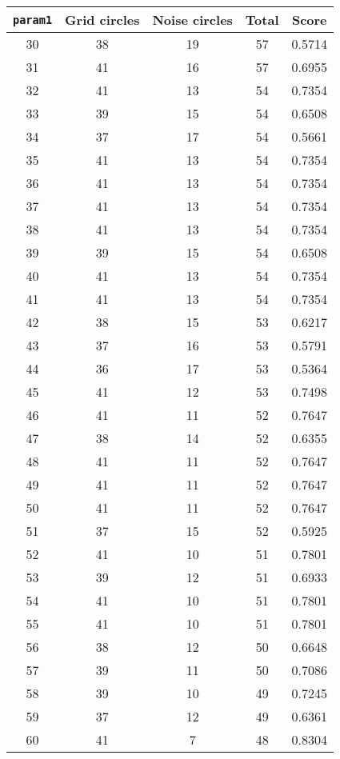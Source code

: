 \documentclass[letterpaper, 12pt]{article}
\begin{document}
\begin{longtable}{|c|c|c|c|c|}
\hline
\textbf{\texttt{param1}} & \textbf{Grid circles} & \textbf{Noise circles} & \textbf{Total} & \textbf{Score} \\
\hline
30 & 38 & 19 & 57 & 0.5714 \\
\hline
31 & 41 & 16 & 57 & 0.6955 \\
\hline
32 & 41 & 13 & 54 & 0.7354 \\
\hline
33 & 39 & 15 & 54 & 0.6508 \\
\hline
34 & 37 & 17 & 54 & 0.5661 \\
\hline
35 & 41 & 13 & 54 & 0.7354 \\
\hline
36 & 41 & 13 & 54 & 0.7354 \\
\hline
37 & 41 & 13 & 54 & 0.7354 \\
\hline
38 & 41 & 13 & 54 & 0.7354 \\
\hline
39 & 39 & 15 & 54 & 0.6508 \\
\hline
40 & 41 & 13 & 54 & 0.7354 \\
\hline
41 & 41 & 13 & 54 & 0.7354 \\
\hline
42 & 38 & 15 & 53 & 0.6217 \\
\hline
43 & 37 & 16 & 53 & 0.5791 \\
\hline
44 & 36 & 17 & 53 & 0.5364 \\
\hline
45 & 41 & 12 & 53 & 0.7498 \\
\hline
46 & 41 & 11 & 52 & 0.7647 \\
\hline
47 & 38 & 14 & 52 & 0.6355 \\
\hline
48 & 41 & 11 & 52 & 0.7647 \\
\hline
49 & 41 & 11 & 52 & 0.7647 \\
\hline
50 & 41 & 11 & 52 & 0.7647 \\
\hline
51 & 37 & 15 & 52 & 0.5925 \\
\hline
52 & 41 & 10 & 51 & 0.7801 \\
\hline
53 & 39 & 12 & 51 & 0.6933 \\
\hline
54 & 41 & 10 & 51 & 0.7801 \\
\hline
55 & 41 & 10 & 51 & 0.7801 \\
\hline
56 & 38 & 12 & 50 & 0.6648 \\
\hline
57 & 39 & 11 & 50 & 0.7086 \\
\hline
58 & 39 & 10 & 49 & 0.7245 \\
\hline
59 & 37 & 12 & 49 & 0.6361 \\
\hline
60 & 41 & 7 & 48 & 0.8304 \\

\end{longtable}
\end{document}

